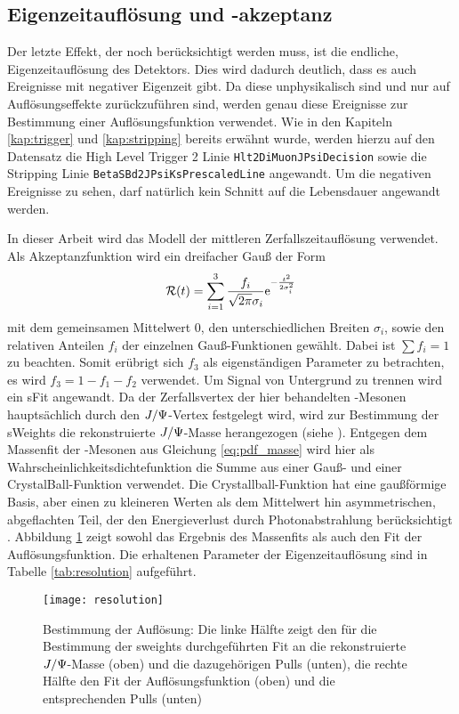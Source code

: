 \subsection{Eigenzeitauflösung und -akzeptanz}
Der letzte Effekt, der noch berücksichtigt werden muss, ist die endliche, Eigenzeitauflösung des Detektors. Dies wird dadurch deutlich, dass es auch Ereignisse mit negativer Eigenzeit gibt. Da diese unphysikalisch sind und nur auf Auflösungseffekte zurückzuführen sind, werden genau diese Ereignisse zur Bestimmung einer Auflösungsfunktion verwendet. Wie in den Kapiteln \ref{kap:trigger} und \ref{kap:stripping} bereits erwähnt wurde, werden hierzu auf den Datensatz die High Level Trigger 2 Linie \texttt{Hlt2DiMuonJPsiDecision} sowie die Stripping Linie \texttt{BetaSBd2JPsiKsPrescaledLine} angewandt. Um die negativen Ereignisse zu sehen, darf natürlich kein Schnitt auf die Lebensdauer angewandt werden.

In dieser Arbeit wird das Modell der mittleren Zerfallszeitauflösung verwendet. Als Akzeptanzfunktion wird ein dreifacher Gauß der Form
\begin{align}
\mathcal{R}(t) = \sum_{i=1}^{3} \frac{f_i}{\sqrt{2\pi}\sigma_i}\mathrm{e}^{-\frac{t^2}{2\sigma_i^2}}
\end{align}
mit dem gemeinsamen Mittelwert $0$, den unterschiedlichen Breiten $\sigma_i$, sowie den relativen Anteilen $f_i$ der einzelnen Gauß-Funktionen gewählt. Dabei ist $\sum f_i = 1$ zu beachten. Somit erübrigt sich $f_3$ als eigenständigen Parameter zu betrachten, es wird $f_3 = 1 - f_1 - f_2$ verwendet. Um Signal von Untergrund zu trennen wird ein sFit angewandt. Da der Zerfallsvertex der hier behandelten \Bd-Mesonen hauptsächlich durch den $J/\Psi$-Vertex festgelegt wird, wird zur Bestimmung der sWeights die rekonstruierte $J/\Psi$-Masse herangezogen (siehe \cite{6}). Entgegen dem Massenfit der \Bd-Mesonen aus Gleichung \ref{eq:pdf_masse} wird hier als Wahrscheinlichkeitsdichtefunktion die Summe aus einer Gauß- und einer CrystalBall-Funktion verwendet. Die Crystallball-Funktion hat eine gaußförmige Basis, aber einen zu kleineren Werten als dem Mittelwert hin asymmetrischen, abgeflachten Teil, der den Energieverlust durch Photonabstrahlung berücksichtigt \cite{crystal_ball}. Abbildung \ref{fig:resolution} zeigt sowohl das Ergebnis des Massenfits als auch den Fit der Auflösungsfunktion. Die erhaltenen Parameter der Eigenzeitauflösung sind in Tabelle \ref{tab:resolution} aufgeführt.

\begin{figure}[hptb]
\centering
\texttt{[image: resolution]}
\caption{Bestimmung der Auflösung: Die linke Hälfte zeigt den für die Bestimmung der sweights durchgeführten Fit an die rekonstruierte $J/\Psi$-Masse (oben) und die dazugehörigen Pulls (unten), die rechte Hälfte den Fit der Auflösungsfunktion (oben) und die entsprechenden Pulls (unten)}
\label{fig:resolution}
\end{figure}

